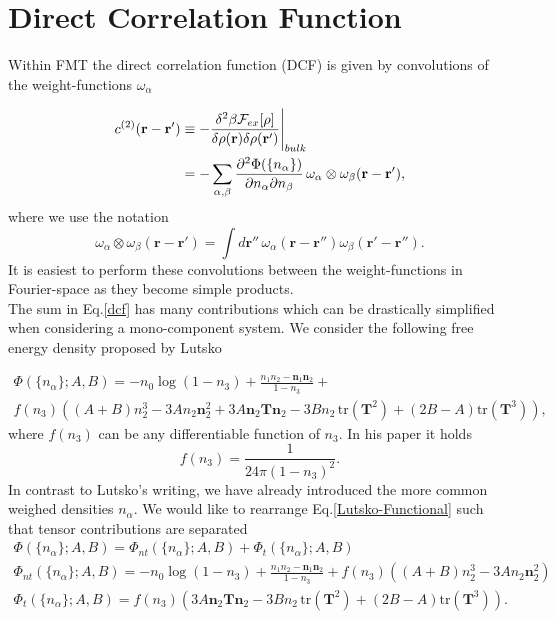 \documentclass{article}
\begin{document}
\section{Direct Correlation Function}

Within FMT the direct correlation function (DCF) is given by convolutions of the weight-functions $\omega_\alpha$

\begin{align}\label{dcf}
	c^{(2)}(\mathbf{r}-\mathbf{r}') &\equiv -\frac{\delta^2\beta{\cal F}_{ex}[\rho]}{\delta\rho(\mathbf{r})\delta\rho(\mathbf{r}')}\Bigg|_{bulk}\\\nonumber
	&=-\sum_{\alpha,\beta}\frac{\partial^2\Phi(\{n_\alpha\})}{\partial n_\alpha\partial n_\beta}\,\omega_\alpha\otimes\omega_\beta(\mathbf{r}-\mathbf{r}'),
\end{align}
where we use the notation
\begin{equation}
	\omega_\alpha\otimes\omega_\beta(\mathbf{r}-\mathbf{r}') = \int d\mathbf{r}''\,\omega_\alpha(\mathbf{r}-\mathbf{r}'')\omega_\beta(\mathbf{r'-\mathbf{r}''}).
\end{equation}
It is easiest to perform these convolutions between the weight-functions in Fourier-space as they become simple products.\\
The sum in Eq.\eqref{dcf} has many contributions which can be drastically simplified when considering a mono-component system. We consider the following free energy density proposed by Lutsko

\begin{gather}\label{Lutsko-Functional}
	\Phi(\{n_\alpha\};A,B) = -n_0\log(1-n_3)+\frac{n_1n_2-\mathbf{n}_1\mathbf{n}_2}{1-n_3}+\\\nonumber
	f(n_3)\left( (A+B)n_2^3-3An_2\mathbf{n}_2^2+3A\mathbf{n}_2\mathbf{T}\mathbf{n}_2-3Bn_2\,\text{tr}(\mathbf{T}^2)+(2B-A)\text{tr}(\mathbf{T}^3)\right),
\end{gather}
where $f(n_3)$ can be any differentiable function of $n_3$. In his paper it holds
\begin{equation}
	f(n_3) = \frac{1}{24\pi(1-n_3)^2}.
\end{equation}
 In contrast to Lutsko's writing, we have already introduced the more common weighed densities $n_\alpha$. We would like to rearrange Eq.\eqref{Lutsko-Functional} such that tensor contributions are separated 
\begin{gather}
	\Phi(\{n_\alpha\};A,B) = \Phi_{nt}(\{n_\alpha\};A,B)+\Phi_t(\{n_\alpha\};A,B)\\\nonumber
	\Phi_{nt}(\{n_\alpha\};A,B)=-n_0\log(1-n_3)+\frac{n_1n_2-\mathbf{n}_1\mathbf{n}_2}{1-n_3}+
	f(n_3)\left( (A+B)n_2^3-3An_2\mathbf{n}_2^2\right)\\\nonumber
	\Phi_t(\{n_\alpha\};A,B) = f(n_3)\left(3A\mathbf{n}_2\mathbf{T}\mathbf{n}_2-3Bn_2\,\text{tr}(\mathbf{T}^2)+(2B-A)\text{tr}(\mathbf{T}^3)\right).
\end{gather} 
\end{document}
